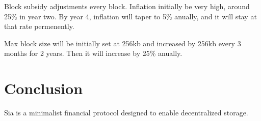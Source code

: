 \documentclass[twocolumn]{article}
\begin{document}
Block subsidy adjustments every block.
Inflation initially be very high, around 25\% in year two.
By year 4, inflation will taper to 5\% anually, and it will stay at that rate permenently.

Max block size will be initially set at 256kb and increased by 256kb every 3 months for 2 years.
Then it will increase by 25\% anually.

\section{Conclusion}
Sia is a minimalist financial protocol designed to enable decentralized storage.



\end{document}
